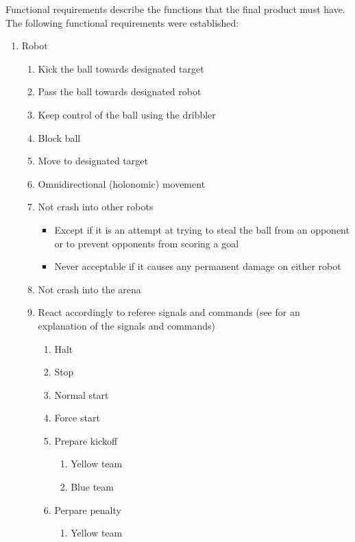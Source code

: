 Functional requirements describe the functions that the final product must have. The following functional requirements were established:
\begin{enumerate}[label*=\arabic*.]
    \item Robot
    \begin{enumerate}[label*=\arabic*.]
        \item Kick the ball towards designated target
        \item Pass the ball towards designated robot
        \item Keep control of the ball using the dribbler
        \item Block ball
        \item Move to designated target
        \item Omnidirectional (holonomic) movement
        \item Not crash into other robots
        \begin{itemize}
            \item Except if it is an attempt at trying to steal the ball from an opponent or to prevent opponents from scoring a goal
            \item Never acceptable if it causes any permanent damage on either robot
        \end{itemize}
        \item Not crash into the arena
        \item React accordingly to referee signals and commands (see\:\cite{robocup_small_size_league_rules_2024} for an explanation of the signals and commands)
        \begin{enumerate}[label*=\arabic*.]
            \item Halt
            \item Stop
            \item Normal start
            \item Force start
            \item Prepare kickoff
            \begin{enumerate}[label*=\arabic*.]
                \item Yellow team
                \item Blue team
            \end{enumerate}
            \item Perpare penalty
            \begin{enumerate}[label*=\arabic*.]
                \item Yellow team

\end{enumerate}
\end{enumerate}
\end{enumerate}
\end{enumerate}
